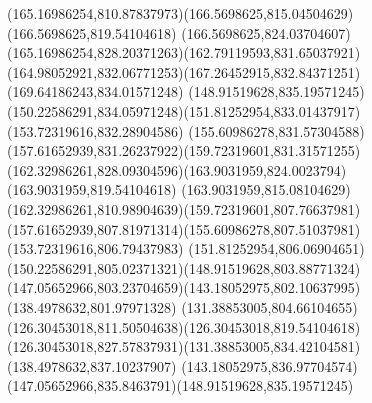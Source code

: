{{	\curveto(165.16986254,810.87837973)(166.5698625,815.04504629)(166.5698625,819.54104618)
	\curveto(166.5698625,824.03704607)(165.16986254,828.20371263)(162.79119593,831.65037921)
	\curveto(164.98052921,832.06771253)(167.26452915,832.84371251)(169.64186243,834.01571248)
	\moveto(148.91519628,835.19571245)
	\curveto(150.22586291,834.05971248)(151.81252954,833.01437917)(153.72319616,832.28904586)
	\curveto(155.60986278,831.57304588)(157.61652939,831.26237922)(159.72319601,831.31571255)
	\curveto(162.32986261,828.09304596)(163.9031959,824.0023794)(163.9031959,819.54104618)
	\curveto(163.9031959,815.08104629)(162.32986261,810.98904639)(159.72319601,807.76637981)
	\curveto(157.61652939,807.81971314)(155.60986278,807.51037981)(153.72319616,806.79437983)
	\curveto(151.81252954,806.06904651)(150.22586291,805.02371321)(148.91519628,803.88771324)
	\curveto(147.05652966,803.23704659)(143.18052975,802.10637995)(138.4978632,801.97971328)
	\curveto(131.38853005,804.66104655)(126.30453018,811.50504638)(126.30453018,819.54104618)
	\curveto(126.30453018,827.57837931)(131.38853005,834.42104581)(138.4978632,837.10237907)
	\curveto(143.18052975,836.97704574)(147.05652966,835.8463791)(148.91519628,835.19571245)
}
}

